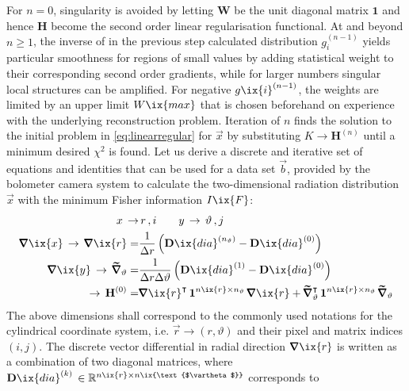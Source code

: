         For $n=0$, singularity is avoided by letting $\mathbf{W}$ be the unit diagonal matrix $\mathbf{1}$ and hence $\mathbf{H}$ become the second order linear regularisation functional. At and beyond $n\ge1$, the inverse of in the previous step calculated distribution $g_{i}^{\left(n-1\right)}$ yields particular smoothness for regions of small values by adding statistical weight to their corresponding second order gradients, while for larger numbers singular local structures can be amplified. For negative $g\ix{i}^{\left(n-1\right)}$, the weights are limited by an upper limit $W\ix{max}$ that is chosen beforehand on experience with the underlying reconstruction problem. Iteration of $n$ finds the solution to the initial problem in \cref{eq:linearregular} for $\vec{x}$ by substituting $K\rightarrow\mathbf{H}^{\left(n\right)}$ until a minimum desired $\chi^{2}$ is found. Let us derive a discrete and iterative set of equations and identities that can be used for a data set $\vec{b}$, provided by the bolometer camera system to calculate the two-dimensional radiation distribution $\vec{x}$ with the minimum Fisher information $I\ix{F}$:%
%
        \begin{align}%
            \begin{split}%
                x\,\to&\, r\,,i\qquad y\,\to\,\vartheta\,,j\\%
                \pmb{\nabla}\ix{x}\,\to\,\pmb{\nabla}\ix{r}=&\frac{1}{\Delta r}\left(\mathbf{D}\ix{dia}^{\left(n_{\vartheta}\right)}-\mathbf{D}\ix{dia}^{\left(0\right)}\right)\\%
                \pmb{\nabla}\ix{y}\,\to\,\pmb{\widetilde{\nabla}}_{\vartheta}= &\frac{1}{\Delta r\Delta\vartheta}\left(\mathbf{D}\ix{dia}^{\left(1\right)}-\mathbf{D}\ix{dia}^{\left(0\right)}\right)\\%
                \to\,\mathbf{H}^{\left(0\right)}=&\pmb{\nabla}\ix{r}^{\intercal}\,\mathbf{1}^{n\ix{r}\times n_{\vartheta}}\,\pmb{\nabla}\ix{r}+\pmb{\widetilde{\nabla}}_{\vartheta}^{\intercal}\,\mathbf{1}^{n\ix{r}\times n_{\vartheta}}\,\pmb{\widetilde{\nabla}}_{\vartheta}%
            \end{split}\label{eq:fisher_algo}%
        \end{align}%
%
        The above dimensions shall correspond to the commonly used notations for the cylindrical coordinate system, i.e. $\vec{r}\rightarrow\left(r,\vartheta\right)$ and their pixel and matrix indices $\left(i,j\right)$. The discrete vector differential in radial direction $\pmb{\nabla}\ix{r}$ is written as a combination of two diagonal matrices, where $\mathbf{D}\ix{dia}^{\left(k\right)}\,\in\mathbb{R}^{n\ix{r}\times n\ix{\text{$\vartheta$}}}$ corresponds to%
